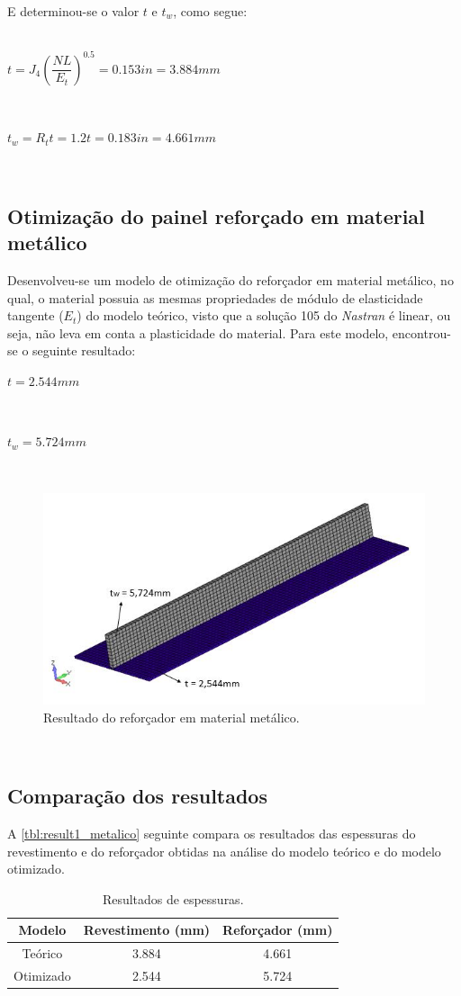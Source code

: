 E determinou-se o valor $t$ e $t_w$, como segue:\\~\\

\centerline{$t = J_4({\dfrac{NL}{E_t}})^{0.5} = 0.153 in = 3.884 mm$}\

\centerline{$t_w = {R_t}t= 1.2t = 0.183in = 4.661 mm$}\


\subsection{Otimização do painel reforçado em material metálico}
Desenvolveu-se um modelo de otimização do reforçador em material metálico, no qual, o material possuia as mesmas propriedades de módulo de elasticidade tangente ($E_t$) do modelo teórico, visto que a solução 105 do \emph{Nastran} é linear, ou seja, não leva em conta a plasticidade do material. Para este modelo, encontrou-se o seguinte resultado:\

\centerline{$t = 2.544 mm$}\

\centerline{$t_w = 5.724 mm$}\

\begin{figure}[ht]
 \caption{\label{fig_ModelMetallic}Resultado do reforçador em material metálico.}
 \centering
 \includegraphics[scale=1.0]{figura/Model_Metallic1}
\end{figure}
\

\subsection{Comparação dos resultados}
A \autoref{tbl:result1_metalico} seguinte compara os resultados das espessuras do revestimento e do reforçador obtidas na análise do modelo teórico e do modelo otimizado.
\begin{table}[h]
\centering
\begin{tabular}{ccc}
\toprule
Modelo & Revestimento (mm) & Reforçador (mm) \\\midrule
Teórico & 3.884 & 4.661\\
Otimizado & 2.544 & 5.724\\
\bottomrule
\end{tabular}
\caption{Resultados de espessuras.}
\label{tbl:result1_metalico}
\end{table}

